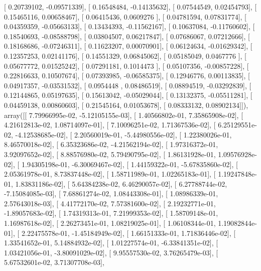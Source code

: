 \documentclass{article}
\begin{document}
       [ 0.20739102, -0.09571339],
       [ 0.16548484, -0.14135632],
       [ 0.07544549,  0.02454793],
       [ 0.15465116,  0.00658467],
       [ 0.06415436,  0.0609276 ],
       [ 0.04781594,  0.07831774],
       [ 0.04359359, -0.05663133],
       [ 0.13434393, -0.11562167],
       [ 0.10637084, -0.11760602],
       [ 0.18540693, -0.08588798],
       [ 0.03804507,  0.06217847],
       [ 0.07686067,  0.07212666],
       [ 0.18168686, -0.07246311],
       [ 0.11623207,  0.00070901],
       [ 0.06124634, -0.01629342],
       [ 0.12357253,  0.02141176],
       [ 0.14551329,  0.06845062],
       [ 0.05185049,  0.0467776 ],
       [ 0.05677772,  0.01525242],
       [ 0.07291181,  0.1014473 ],
       [ 0.05107356, -0.00857228],
       [ 0.22816633,  0.10507674],
       [ 0.07393985, -0.06585375],
       [ 0.12946776,  0.00113835],
       [ 0.04917357, -0.03531532],
       [ 0.0954448 ,  0.08486519],
       [ 0.08894519, -0.03292839],
       [ 0.12144865,  0.05197635],
       [ 0.15613042, -0.05029044],
       [ 0.13132375, -0.05511281],
       [ 0.04459138,  0.00860603],
       [ 0.21545164,  0.01053678],
       [ 0.08333132,  0.08902134]]), array([[  7.79966995e-02,  -5.12105155e-03],
       [  1.40566802e-01,   7.35865908e-02],
       [  4.21612813e-02,   1.08714097e-01],
       [  7.10096251e-02,   1.71367536e-02],
       [  6.25129551e-02,  -4.12538685e-02],
       [  2.20560019e-01,  -5.44980556e-02],
       [  1.22380026e-01,   8.46570018e-02],
       [  6.35323686e-02,  -4.21562194e-02],
       [  1.97316372e-01,   3.92097652e-02],
       [  8.88576980e-02,   5.79490795e-02],
       [  1.86131928e-01,   1.09576928e-02],
       [  1.94305198e-01,  -6.30069467e-02],
       [  1.44159322e-01,  -5.67835860e-02],
       [  2.05361978e-01,   8.73837448e-02],
       [  1.58711989e-01,   1.02265183e-01],
       [  1.19247848e-01,   1.83831186e-02],
       [  5.64384238e-02,   6.46290057e-02],
       [  6.27788744e-02,  -7.15084085e-03],
       [  7.68861274e-02,   1.08443308e-01],
       [  1.08986339e-01,   2.57643018e-03],
       [  4.41772170e-02,   7.57381600e-02],
       [  2.19232771e-01,  -1.89057683e-02],
       [  1.74319313e-01,   7.21999353e-02],
       [  1.58709148e-01,   1.16987618e-02],
       [  2.26273451e-01,   1.08219025e-01],
       [  1.06108344e-01,   1.19082844e-01],
       [  2.22475578e-01,  -1.45184949e-02],
       [  1.66151333e-01,   1.71836446e-02],
       [  1.33541652e-01,   5.14884932e-02],
       [  1.01227574e-01,  -6.33841351e-02],
       [  1.03421056e-01,  -3.80091029e-02],
       [  9.95557530e-02,   3.76265479e-03],
       [  5.67532601e-02,   3.71307708e-03],
\end{document}
